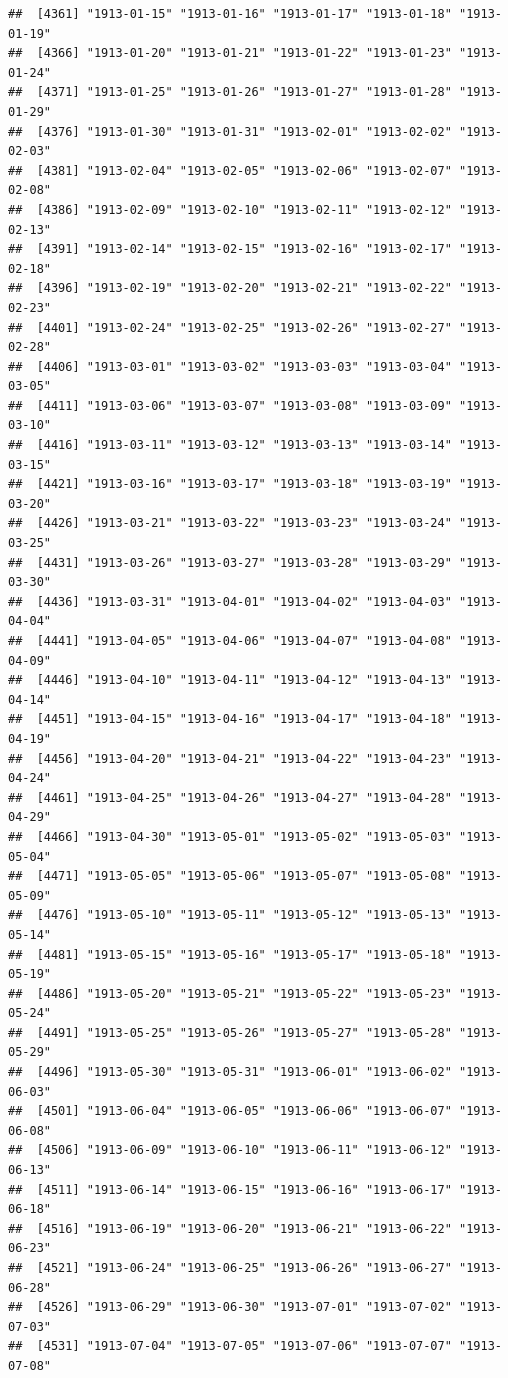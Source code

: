 \documentclass{article}\usepackage[]{graphicx}\usepackage[]{color}
\makeatletter
\newenvironment{kframe}{%
 \def\at@end@of@kframe{}%
 \ifinner\ifhmode%
  \def\at@end@of@kframe{\end{minipage}}%
  \begin{minipage}{\columnwidth}%
 \fi\fi%
 \def\FrameCommand##1{\hskip\@totalleftmargin \hskip-\fboxsep
 \colorbox{shadecolor}{##1}\hskip-\fboxsep
     \hskip-\linewidth \hskip-\@totalleftmargin \hskip\columnwidth}%
 \MakeFramed {\advance\hsize-\width
   \@totalleftmargin\z@ \linewidth\hsize
   \@setminipage}}%
 {\par\unskip\endMakeFramed%
 \at@end@of@kframe}
\newenvironment{knitrout}{}{} %
\makeatother
\begin{document}
\begin{description}
\begin{knitrout}
\begin{kframe}
\begin{verbatim}
##  [4361] "1913-01-15" "1913-01-16" "1913-01-17" "1913-01-18" "1913-01-19"
##  [4366] "1913-01-20" "1913-01-21" "1913-01-22" "1913-01-23" "1913-01-24"
##  [4371] "1913-01-25" "1913-01-26" "1913-01-27" "1913-01-28" "1913-01-29"
##  [4376] "1913-01-30" "1913-01-31" "1913-02-01" "1913-02-02" "1913-02-03"
##  [4381] "1913-02-04" "1913-02-05" "1913-02-06" "1913-02-07" "1913-02-08"
##  [4386] "1913-02-09" "1913-02-10" "1913-02-11" "1913-02-12" "1913-02-13"
##  [4391] "1913-02-14" "1913-02-15" "1913-02-16" "1913-02-17" "1913-02-18"
##  [4396] "1913-02-19" "1913-02-20" "1913-02-21" "1913-02-22" "1913-02-23"
##  [4401] "1913-02-24" "1913-02-25" "1913-02-26" "1913-02-27" "1913-02-28"
##  [4406] "1913-03-01" "1913-03-02" "1913-03-03" "1913-03-04" "1913-03-05"
##  [4411] "1913-03-06" "1913-03-07" "1913-03-08" "1913-03-09" "1913-03-10"
##  [4416] "1913-03-11" "1913-03-12" "1913-03-13" "1913-03-14" "1913-03-15"
##  [4421] "1913-03-16" "1913-03-17" "1913-03-18" "1913-03-19" "1913-03-20"
##  [4426] "1913-03-21" "1913-03-22" "1913-03-23" "1913-03-24" "1913-03-25"
##  [4431] "1913-03-26" "1913-03-27" "1913-03-28" "1913-03-29" "1913-03-30"
##  [4436] "1913-03-31" "1913-04-01" "1913-04-02" "1913-04-03" "1913-04-04"
##  [4441] "1913-04-05" "1913-04-06" "1913-04-07" "1913-04-08" "1913-04-09"
##  [4446] "1913-04-10" "1913-04-11" "1913-04-12" "1913-04-13" "1913-04-14"
##  [4451] "1913-04-15" "1913-04-16" "1913-04-17" "1913-04-18" "1913-04-19"
##  [4456] "1913-04-20" "1913-04-21" "1913-04-22" "1913-04-23" "1913-04-24"
##  [4461] "1913-04-25" "1913-04-26" "1913-04-27" "1913-04-28" "1913-04-29"
##  [4466] "1913-04-30" "1913-05-01" "1913-05-02" "1913-05-03" "1913-05-04"
##  [4471] "1913-05-05" "1913-05-06" "1913-05-07" "1913-05-08" "1913-05-09"
##  [4476] "1913-05-10" "1913-05-11" "1913-05-12" "1913-05-13" "1913-05-14"
##  [4481] "1913-05-15" "1913-05-16" "1913-05-17" "1913-05-18" "1913-05-19"
##  [4486] "1913-05-20" "1913-05-21" "1913-05-22" "1913-05-23" "1913-05-24"
##  [4491] "1913-05-25" "1913-05-26" "1913-05-27" "1913-05-28" "1913-05-29"
##  [4496] "1913-05-30" "1913-05-31" "1913-06-01" "1913-06-02" "1913-06-03"
##  [4501] "1913-06-04" "1913-06-05" "1913-06-06" "1913-06-07" "1913-06-08"
##  [4506] "1913-06-09" "1913-06-10" "1913-06-11" "1913-06-12" "1913-06-13"
##  [4511] "1913-06-14" "1913-06-15" "1913-06-16" "1913-06-17" "1913-06-18"
##  [4516] "1913-06-19" "1913-06-20" "1913-06-21" "1913-06-22" "1913-06-23"
##  [4521] "1913-06-24" "1913-06-25" "1913-06-26" "1913-06-27" "1913-06-28"
##  [4526] "1913-06-29" "1913-06-30" "1913-07-01" "1913-07-02" "1913-07-03"
##  [4531] "1913-07-04" "1913-07-05" "1913-07-06" "1913-07-07" "1913-07-08"

\end{verbatim}
\end{kframe}
\end{knitrout}
\end{description}
\end{document}
